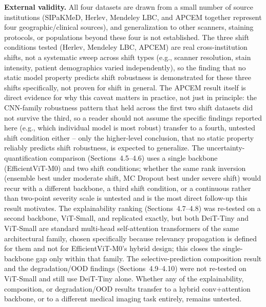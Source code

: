 \documentclass[runningheads]{llncs}
\begin{document}
\textbf{External validity.} All four datasets are drawn from a small
number of source institutions (SIPaKMeD, Herlev, Mendeley LBC, and APCEM
together represent four geographic/clinical sources), and generalization
to other scanners, staining protocols, or populations beyond these four is
not established. The three shift conditions tested (Herlev, Mendeley LBC,
APCEM) are real cross-institution shifts, not a systematic sweep across
shift types (e.g., scanner resolution, stain intensity, patient
demographics varied independently), so the finding that no static model
property predicts shift robustness is demonstrated for these three shifts
specifically, not proven for shift in general. The APCEM result itself is
direct evidence for why this caveat matters in practice, not just in
principle: the CNN-family robustness pattern that held across the first
two shift datasets did not survive the third, so a reader should not
assume the specific findings reported here (e.g., which individual model
is most robust) transfer to a fourth, untested shift condition either --
only the higher-level conclusion, that no static property reliably
predicts shift robustness, is expected to generalize. The
uncertainty-quantification comparison (Sections~4.5--4.6) uses a single
backbone (EfficientViT-M0) and two shift conditions; whether the same rank
inversion (ensemble best under moderate shift, MC Dropout best under
severe shift) would recur with a different backbone, a third shift
condition, or a continuous rather than two-point severity scale is
untested and is the most direct follow-up this result motivates. The
explainability ranking (Sections~4.7--4.8) was re-tested on a second
backbone, ViT-Small, and replicated exactly, but both DeiT-Tiny and
ViT-Small are standard multi-head self-attention transformers of the same
architectural family, chosen specifically because relevancy propagation
is defined for them and not for EfficientViT-M0's hybrid design; this
closes the single-backbone gap only within that family. The
selective-prediction composition result and the degradation/OOD findings
(Sections~4.9--4.10) were not re-tested on ViT-Small and still use
DeiT-Tiny alone. Whether any of the explainability, composition, or
degradation/OOD results transfer to a hybrid conv+attention backbone, or
to a different medical imaging task entirely, remains untested.
\end{document}
